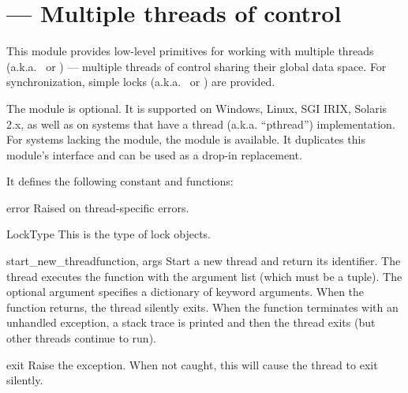 \section{ ---
         Multiple threads of control}



This module provides low-level primitives for working with multiple
threads (a.k.a.\  or ) --- multiple
threads of control sharing their global data space.  For
synchronization, simple locks (a.k.a.\  or ) are provided.

The module is optional.  It is supported on Windows, Linux, SGI
IRIX, Solaris 2.x, as well as on systems that have a \POSIX{} thread
(a.k.a. ``pthread'') implementation.  For systems lacking the 
module, the  module is available.
It duplicates this module's interface and can be
used as a drop-in replacement.

It defines the following constant and functions:

\begin{excdesc}{error}
Raised on thread-specific errors.
\end{excdesc}

\begin{datadesc}{LockType}
This is the type of lock objects.
\end{datadesc}

\begin{funcdesc}{start_new_thread}{function, args}
Start a new thread and return its identifier.  The thread executes the function
 with the argument list  (which must be a tuple).  The
optional  argument specifies a dictionary of keyword arguments.
When the function returns, the thread silently exits.  When the function
terminates with an unhandled exception, a stack trace is printed and
then the thread exits (but other threads continue to run).
\end{funcdesc}

\begin{funcdesc}{exit}{}
Raise the  exception.  When not caught, this
will cause the thread to exit silently.
\end{funcdesc}

